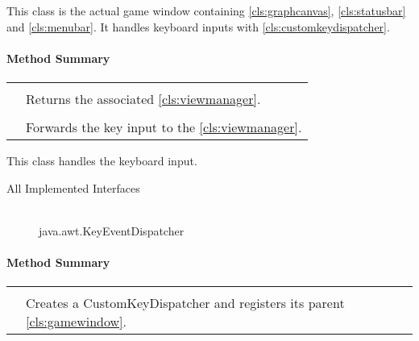 This class is the actual game window containing \ref{cls:graphcanvas}, \ref{cls:statusbar} and \ref{cls:menubar}. It handles keyboard inputs with \ref{cls:customkeydispatcher}. \\ 

\centerdash

\paragraph*{Method Summary}
\paragraph*{}
\begin{longtable}{Lp{10cm}}
	\startmethodtable
	 \\
	& Returns the  associated \ref{cls:viewmanager}. \\
	 \\
	& Forwards the key input to the \ref{cls:viewmanager}. \\ \hline
\end{longtable}


This class handles the keyboard input. \\ 

\begin{description}
	\item[All Implemented Interfaces] \hfill \\
	java.awt.KeyEventDispatcher
\end{description}
\centerdash

\paragraph*{Method Summary}
\paragraph*{}
\begin{longtable}{Lp{10cm}}
	\startmethodtable
	 \\
	& Creates a CustomKeyDispatcher and registers its parent \ref{cls:gamewindow}. \\\hline
\end{longtable}


